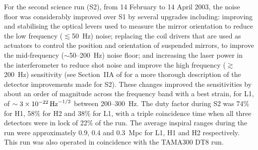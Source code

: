 \documentclass{article}
\begin{document}

For the second science run (S2), from 14 February to 14 April 2003, the noise
floor was considerably improved over S1 by several upgrades including: improving
and stabilising the optical levers used to measure the mirror orientation to
reduce the low frequency ($\lesssim$50~Hz) noise; replacing the coil drivers
that are used as actuators to control the position and orientation of suspended
mirrors, to improve the mid-frequency ($\sim$50--200~Hz) noise floor; and
increasing the laser power in the interferometer to reduce shot noise and
improve the high frequency ($\gtrsim$200~Hz) sensitivity (see Section~IIA of
\cite{Abbott:2005a} for a more thorough description of the detector improvements
made for S2). These changes improved the sensitivities by about an order of
magnitude across the frequency band with a best strain, for L1, of
$\sim3\times10^{-22}\,{\rm Hz}^{-1/2}$ between 200--300~Hz. The duty factor
during S2 was 74\% for H1, 58\% for H2 and 38\% for L1, with a triple
coincidence time when all three detectors were in lock of 22\% of the run. The
average inspiral ranges during the run were approximately 0.9, 0.4 and 0.3~Mpc
for L1, H1 and H2 respectively. This run was also operated in coincidence with
the TAMA300 DT8 run.
\end{document}
